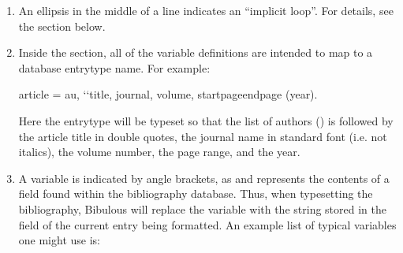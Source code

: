 \documentclass[letterpaper,10pt,english]{sphinxmanual}
\begin{document}
\begin{enumerate}
\item {} 
An ellipsis in the middle of a line indicates an “implicit loop”. For details, see the  section below.

\item {} 
Inside the  section, all of the variable definitions are intended to map to a database entrytype name. For example:

%
\begin{sphinxVerbatim}[commandchars=\\\{\}]
article = \PYGZlt{}au\PYGZgt{}, {}`{}`\PYGZlt{}title\PYGZgt{},\PYGZsq{}\PYGZsq{} \PYGZlt{}journal\PYGZgt{}, \PYGZlt{}volume\PYGZgt{}, \PYGZlt{}startpage\PYGZgt{}\PYGZhy{}\PYGZhy{}\PYGZlt{}endpage\PYGZgt{} (\PYGZlt{}year\PYGZgt{}).
\end{sphinxVerbatim}

Here the  entrytype will be typeset so that the list of authors () is followed by the article title in double quotes, the journal name in standard font (i.e. not italics), the volume number, the page range, and the year.

\item {} 
A variable is indicated by angle brackets, as  and represents the contents of a field found within the bibliography database. Thus, when typesetting the bibliography, Bibulous will replace the variable  with the string stored in the  field of the current entry being formatted. An example list of typical variables one might use is:
\begin{quote}


\end{quote}
\end{enumerate}
\end{document}
